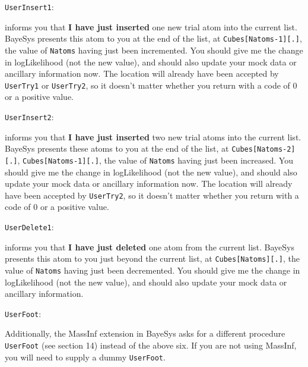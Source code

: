 \medskip
{\tt UserInsert1}:

 informs you that {\bf I have just inserted} one new trial atom into the current list.  
BayeSys presents this atom to you at the end of the list, at {\tt Cubes[Natoms-1][.]}, the value of {\tt Natoms} having just been incremented.  
You should give me the change in logLikelihood (not the new value), and should also update your mock data or ancillary information now.  
The location will already have been accepted by {\tt UserTry1} or {\tt UserTry2}, so it doesn't matter whether you return with a code of 0 or a positive value.
 

\medskip
{\tt UserInsert2}:

 informs you that {\bf I have just inserted} two new trial atoms into the current list.  
BayeSys presents these atoms to you at the end of the list, at {\tt Cubes[Natoms-2][.]}, {\tt Cubes[Natoms-1][.]}, 
the value of {\tt Natoms} having just been increased.  
You should give me the change in logLikelihood (not the new value), and should also update your mock data or ancillary information now.  
The location will already have been accepted by {\tt UserTry2}, so it doesn't matter whether you return with a code of 0 or a positive value.
 

\medskip
{\tt UserDelete1}:

 informs you that {\bf I have just deleted} one atom from the current list.  
BayeSys presents this atom to you just beyond the current list, at {\tt Cubes[Natoms][.]}, the value of {\tt Natoms} having just been decremented.  
You should give me the change in logLikelihood (not the new value), and should also update your mock data or ancillary information.

\medskip
{\tt UserFoot}:

\noindent Additionally, the MassInf extension in BayeSys asks for a different procedure {\tt UserFoot} (see section 14) instead of the above six.  
If you are not using MassInf, you will need to supply a dummy {\tt UserFoot}.

\vfill\eject
{}
\bigskip

